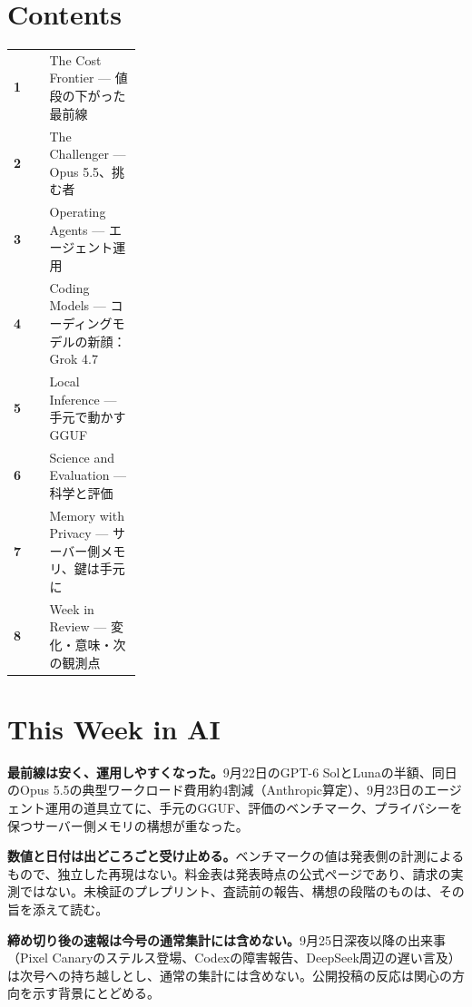 \section*{Contents}
\begin{tabularx}{0.98\linewidth}{@{}>{\bfseries}p{0.28\linewidth}X@{}}
  1 & The Cost Frontier --- 値段の下がった最前線 \\
  2 & The Challenger --- Opus 5.5、挑む者 \\
  3 & Operating Agents --- エージェント運用 \\
  4 & Coding Models --- コーディングモデルの新顔：Grok 4.7 \\
  5 & Local Inference --- 手元で動かすGGUF \\
  6 & Science and Evaluation --- 科学と評価 \\
  7 & Memory with Privacy --- サーバー側メモリ、鍵は手元に \\
  8 & Week in Review --- 変化・意味・次の観測点 \\
\end{tabularx}

\vspace{4mm}
\section*{This Week in AI}

\begin{tcolorbox}[enhanced,colback=SurveySoft,colframe=SurveyRule,boxrule=0.4pt,arc=1mm,left=3mm,right=3mm,top=2mm,bottom=2mm]
\textbf{最前線は安く、運用しやすくなった。}\quad 9月22日のGPT-6 SolとLunaの半額、同日のOpus 5.5の典型ワークロード費用約4割減（Anthropic算定）、9月23日のエージェント運用の道具立てに、手元のGGUF、評価のベンチマーク、プライバシーを保つサーバー側メモリの構想が重なった。
\end{tcolorbox}

\begin{tcolorbox}[enhanced,colback=SurveySoft,colframe=SurveyRule,boxrule=0.4pt,arc=1mm,left=3mm,right=3mm,top=2mm,bottom=2mm]
\textbf{数値と日付は出どころごと受け止める。}\quad ベンチマークの値は発表側の計測によるもので、独立した再現はない。料金表は発表時点の公式ページであり、請求の実測ではない。未検証のプレプリント、査読前の報告、構想の段階のものは、その旨を添えて読む。
\end{tcolorbox}

\begin{tcolorbox}[enhanced,colback=SurveySoft,colframe=SurveyRule,boxrule=0.4pt,arc=1mm,left=3mm,right=3mm,top=2mm,bottom=2mm]
\textbf{締め切り後の速報は今号の通常集計には含めない。}\quad 9月25日深夜以降の出来事（Pixel Canaryのステルス登場、Codexの障害報告、DeepSeek周辺の遅い言及）は次号への持ち越しとし、通常の集計には含めない。公開投稿の反応は関心の方向を示す背景にとどめる。
\end{tcolorbox}

